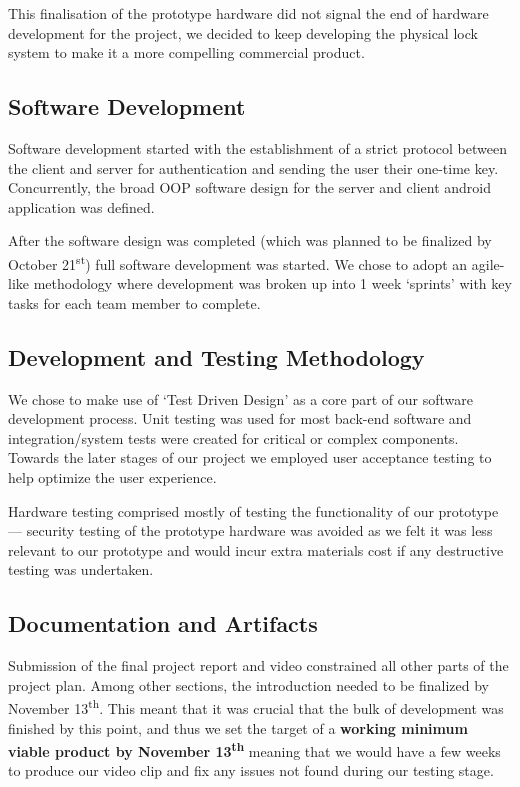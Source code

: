 \documentclass[conference]{IEEEtran}
\begin{document}
	This finalisation of the prototype hardware did not signal the end of hardware development for the project, we decided to keep developing the physical lock system to make it a more compelling commercial product.

\subsection{Software Development}
	Software development started with the establishment of a strict protocol between the client and server for authentication and sending the user their one-time key. Concurrently, the broad OOP software design for the server and client android application was defined.

	After the software design was completed (which was planned to be finalized by October 21\textsuperscript{st}) full software development was started. We chose to adopt an agile-like methodology where development was broken up into 1 week `sprints' with key tasks for each team member to complete.

\subsection{Development and Testing Methodology}
	We chose to make use of `Test Driven Design' as a core part of our software development process. Unit testing was used for most back-end software and integration/system tests were created for critical or complex components. Towards the later stages of our project we employed user acceptance testing to help optimize the user experience.

	Hardware testing comprised mostly of testing the functionality of our prototype --- security testing of the prototype hardware was avoided as we felt it was less relevant to our prototype and would incur extra materials cost if any destructive testing was undertaken.

\subsection{Documentation and Artifacts}	
	Submission of the final project report and video constrained all other parts of the project plan. Among other sections, the introduction needed to be finalized by November 13\textsuperscript{th}. This meant that it was crucial that the bulk of development was finished by this point, and thus we set the target of a \textbf{working minimum viable product by November 13\textsuperscript{th}} meaning that we would have a few weeks to produce our video clip and fix any issues not found during our testing stage.
\end{document}
